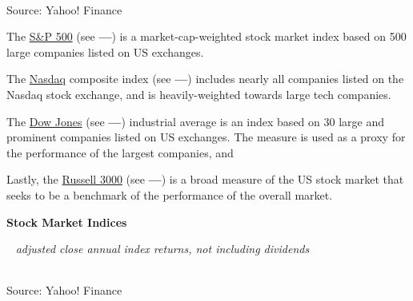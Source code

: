\documentclass{report}
\newcommand{\tbllink}[1]{\href{https://raw.githubusercontent.com/bdecon/US-chartbook/master/chartbook/data/#1}{\faTable}}
\begin{document}
{\begin{minipage}{0.76\textwidth}
\\
\footnotesize{Source: Yahoo! Finance} \hfill \tbllink{equity_indices.csv} 
\end{minipage}
\newpage
\begin{minipage}{0.76\textwidth}
\small The \href{https://us.spindices.com/indices/equity/sp-500}{S\&P 500} (see {\color{green!80!blue!90!black}\textbf{---}}) is a market-cap-weighted stock market index based on 500 large companies listed on US exchanges. 

The \href{https://www.nasdaq.com/market-activity/index/comp}{Nasdaq} composite index (see {\color{blue}\textbf{---}}) includes nearly all companies listed on the Nasdaq stock exchange, and is heavily-weighted towards large tech companies. 

The \href{https://finance.yahoo.com/quote/\%5EDJI/}{Dow Jones} (see {\color{red}\textbf{---}})  industrial average is an index based on 30 large and prominent companies listed on US exchanges. The measure is used as a proxy for the performance of the largest companies, and 

Lastly, the \href{https://www.ftserussell.com/products/indices/russell-us}{Russell 3000} (see {\color{violet}\textbf{---}}) is a broad measure of the US stock market that seeks to be a benchmark of the performance of the overall market. 
\vspace{1mm}

\normalsize \textbf{Stock Market Indices}\\
\footnotesize{\ \textit{\hspace{18mm} adjusted close \hspace{32mm} annual index returns, not including dividends}
\vspace{-2mm}

 \setlength{\tabcolsep}{2.0pt} \color{black!90}
{\renewcommand{\arraystretch}{1.54}
	\begin{tabular}{p{20mm} R{12.0mm} R{12.0mm} R{10.0mm} R{10.0mm} R{10.0mm} R{10.0mm} R{10.0mm} R{10.0mm}}
		 \hline
	\end{tabular}
}}
		
\vspace{-2mm}
\footnotesize{Source: Yahoo! Finance}
\vspace{3mm}


\end{minipage}}
\end{document}
